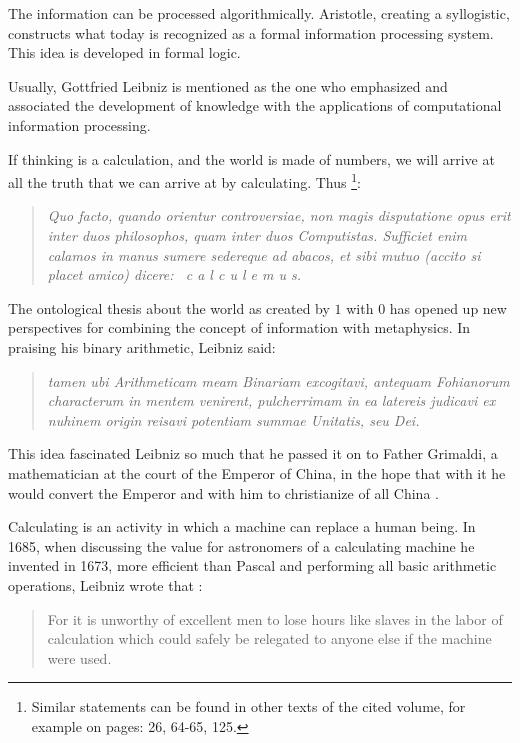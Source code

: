 \documentclass[pdftex,12pt]{article}
\begin{document}
The information can be processed algorithmically. Aristotle, creating a syllogistic, constructs what  today is recognized as a formal information processing system. This idea is developed in formal logic.



Usually, Gottfried Leibniz is mentioned as the one who emphasized and associated the development of knowledge with the applications of computational information processing.

If thinking is a calculation, and the world is made of numbers, we will arrive at all the truth that we can arrive at by calculating. Thus \parencite[p.200]{Leibniz1890}\footnote{Similar statements can be found in other texts of the cited volume, for example on pages: 26, 64-65, 125.}: \begin{quote} \small \emph{Quo facto, quando orientur controversiae, non magis disputatione opus erit inter duos philosophos, quam inter duos Computistas. Sufficiet enim calamos in manus sumere sedereque ad abacos, et sibi mutuo (accito si placet amico) dicere: \ c a l c u l e m u s.}

\smallskip \end{quote}

The ontological thesis about the world as created by $1$ with $0$ has opened up new perspectives for combining the concept of information with metaphysics. In praising his binary arithmetic, Leibniz \parencite*{Leibniz1990} said: \begin{quote} \small \emph{tamen ubi Arithmeticam meam Binariam excogitavi, antequam Fohianorum characterum in mentem venirent, pulcherrimam in ea latereis judicavi ex nuhinem origin reisavi potentiam summae Unitatis, seu Dei.}

\end{quote} This idea fascinated Leibniz so much that he passed it on to Father Grimaldi, a mathematician at the court of the Emperor of China, in the hope that with it he would convert the Emperor and with him to christianize of all China \parencite{list1697}.

Calculating is an activity in which a machine can replace a human being. In 1685, when discussing the value for astronomers of a calculating machine he invented in 1673, more efficient than Pascal and performing all basic arithmetic operations, Leibniz \parencite*[p.181]{Leibniz1685} wrote that \parencite[Ch. I: Leibniz's Dream]{Davis2001}: \begin{quote} \small For it is unworthy of excellent men to lose hours like slaves in the labor of calculation which could safely be relegated to anyone else if the machine were used. \end{quote}
\end{document}
